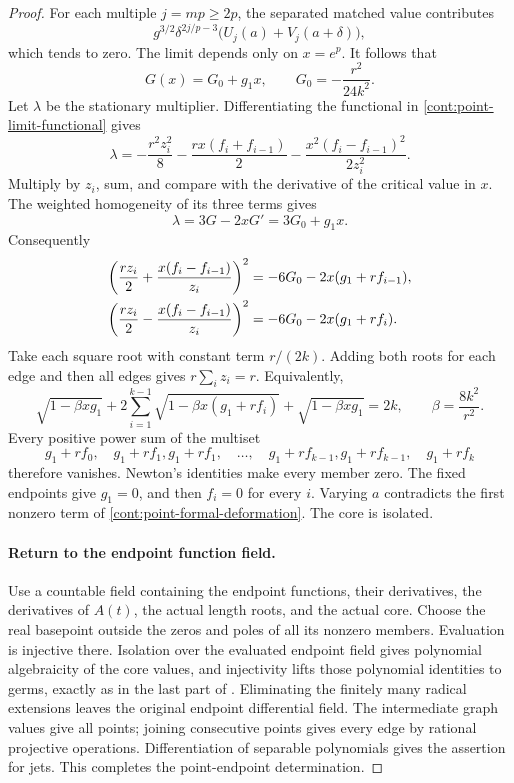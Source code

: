 \begin{proof}
For each multiple \(j=mp\ge2p\), the separated matched
value contributes
\[
 g^{3/2}\delta^{2j/p-3}
      \bigl(U_j(a)+V_j(a+\delta)\bigr),
\]
which tends to zero.  The limit depends only on \(x=e^p\).
It follows that
\begin{equation}
 G(x)=G_0+g_1x,\qquad G_0=-\frac{r^2}{24k^2}.
 \label{cont:point-affine-limit}
\end{equation}
Let \(\lambda\) be the stationary multiplier.  Differentiating
the functional in \eqref{cont:point-limit-functional} gives
\[
 \lambda=-\frac{r^2z_i^2}{8}
       -\frac{rx(f_i+f_{i-1})}{2}
       -\frac{x^2(f_i-f_{i-1})^2}{2z_i^2}.
\]
Multiply by \(z_i\), sum, and compare with the derivative
of the critical value in \(x\).  The weighted homogeneity
of its three terms gives
\[
 \lambda=3G-2xG'=3G_0+g_1x.
\]
Consequently
\begin{align}
 \left(\frac{rz_i}{2}
       +\frac{x(f_i-f_{i-1})}{z_i}\right)^2
       &=-6G_0-2x(g_1+rf_{i-1}),\notag\\
 \left(\frac{rz_i}{2}
       -\frac{x(f_i-f_{i-1})}{z_i}\right)^2
       &=-6G_0-2x(g_1+rf_i).
 \label{cont:point-root-identities}
\end{align}
Take each square root with constant term \(r/(2k)\).
Adding both roots for each edge and then all edges gives
\(r\sum_i z_i=r\).  Equivalently,
\begin{equation}
 \sqrt{1-\beta xg_1}
 +2\sum_{i=1}^{k-1}\sqrt{1-\beta x(g_1+rf_i)}
 +\sqrt{1-\beta xg_1}=2k,
 \qquad \beta=\frac{8k^2}{r^2}.
 \label{cont:point-power-sums}
\end{equation}
Every positive power sum of the multiset
\[
 g_1+rf_0,\quad
 g_1+rf_1,g_1+rf_1,\quad\ldots,\quad
 g_1+rf_{k-1},g_1+rf_{k-1},\quad g_1+rf_k
\]
therefore vanishes.  Newton's identities make every member
zero.  The fixed endpoints give \(g_1=0\), and then
\(f_i=0\) for every \(i\).  Varying \(a\) contradicts the
first nonzero term of \eqref{cont:point-formal-deformation}.
The core is isolated.

\paragraph{Return to the endpoint function field.}
Use a countable field containing the endpoint functions,
their derivatives, the derivatives of \(A(t)\), the actual
length roots, and the actual core.  Choose the real
basepoint outside the zeros and poles of all its nonzero
members.  Evaluation is injective there.  Isolation over
the evaluated endpoint field gives polynomial algebraicity
of the core values, and injectivity lifts those polynomial
identities to germs, exactly as in the last part of
.  Eliminating the finitely many radical
extensions leaves the original endpoint differential
field.  The intermediate graph values give all points;
joining consecutive points gives every edge by rational
projective operations.  Differentiation of separable
polynomials gives the assertion for jets.  This completes
the point-endpoint determination.
\end{proof}

